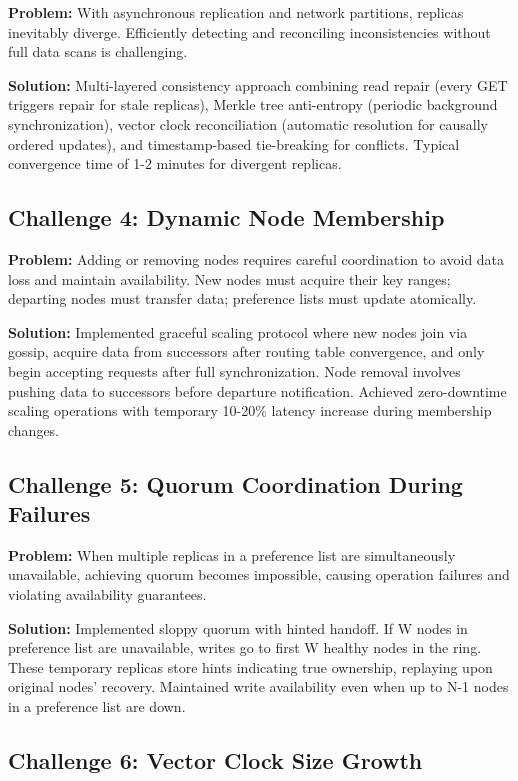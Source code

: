 \documentclass[conference]{IEEEtran}
\begin{document}
\textbf{Problem:} With asynchronous replication and network partitions, replicas inevitably diverge. Efficiently detecting and reconciling inconsistencies without full data scans is challenging.

\textbf{Solution:} Multi-layered consistency approach combining read repair (every GET triggers repair for stale replicas), Merkle tree anti-entropy (periodic background synchronization), vector clock reconciliation (automatic resolution for causally ordered updates), and timestamp-based tie-breaking for conflicts. Typical convergence time of 1-2 minutes for divergent replicas.

\subsection{Challenge 4: Dynamic Node Membership}

\textbf{Problem:} Adding or removing nodes requires careful coordination to avoid data loss and maintain availability. New nodes must acquire their key ranges; departing nodes must transfer data; preference lists must update atomically.

\textbf{Solution:} Implemented graceful scaling protocol where new nodes join via gossip, acquire data from successors after routing table convergence, and only begin accepting requests after full synchronization. Node removal involves pushing data to successors before departure notification. Achieved zero-downtime scaling operations with temporary 10-20\% latency increase during membership changes.

\subsection{Challenge 5: Quorum Coordination During Failures}

\textbf{Problem:} When multiple replicas in a preference list are simultaneously unavailable, achieving quorum becomes impossible, causing operation failures and violating availability guarantees.

\textbf{Solution:} Implemented sloppy quorum with hinted handoff. If W nodes in preference list are unavailable, writes go to first W healthy nodes in the ring. These temporary replicas store hints indicating true ownership, replaying upon original nodes' recovery. Maintained write availability even when up to N-1 nodes in a preference list are down.

\subsection{Challenge 6: Vector Clock Size Growth}
\end{document}
